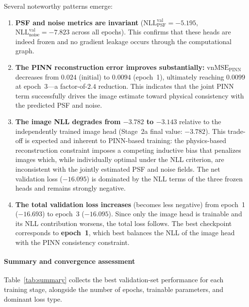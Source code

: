 \documentclass{aa}
\begin{document}
Several noteworthy patterns emerge:
\begin{enumerate}
    \item \textbf{PSF and noise metrics are invariant} ($\mathrm{NLL}_\mathrm{PSF}^\mathrm{val} = -5.195$, $\mathrm{NLL}_\mathrm{noise}^\mathrm{val} = -7.823$ across all epochs). This confirms that these heads are indeed frozen and no gradient leakage occurs through the computational graph.
    \item \textbf{The PINN reconstruction error improves substantially:} $\mathrm{vnMSE}_\mathrm{PINN}$ decreases from $0.024$ (initial) to $0.0094$ (epoch~1), ultimately reaching $0.0099$ at epoch~3---a factor-of-$2.4$ reduction. This indicates that the joint PINN term successfully drives the image estimate toward physical consistency with the predicted PSF and noise.
    \item \textbf{The image NLL degrades from $-3.782$ to $-3.143$} relative to the independently trained image head (Stage~2a final value: $-3.782$). This trade-off is expected and inherent to PINN-based training: the physics-based reconstruction constraint imposes a competing inductive bias that penalizes images which, while individually optimal under the NLL criterion, are inconsistent with the jointly estimated PSF and noise fields. The net validation loss ($-16.095$) is dominated by the NLL terms of the three frozen heads and remains strongly negative.
    \item \textbf{The total validation loss increases} (becomes less negative) from epoch~1 ($-16.693$) to epoch~3 ($-16.095$). Since only the image head is trainable and its NLL contribution worsens, the total loss follows. The best checkpoint corresponds to \textbf{epoch~1}, which best balances the NLL of the image head with the PINN consistency constraint.
\end{enumerate}

\paragraph{Summary and convergence assessment}

Table~\ref{tab:summary} collects the best validation-set performance for each training stage, alongside the number of epochs, trainable parameters, and dominant loss type.
\end{document}
